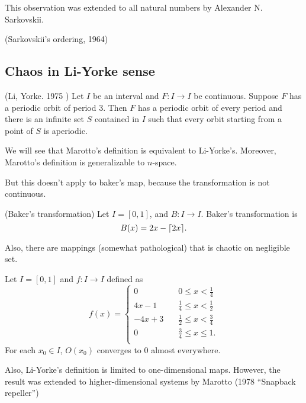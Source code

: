 \documentclass[11pt]{article}
\begin{document}
This observation was extended to all natural numbers by Alexander N. Sarkovskii.
\begin{definition}
  (Sarkovskii's ordering, 1964)
  \label{defn:sarkovskiiordering}
\end{definition}

\subsection{Chaos in Li-Yorke sense}
\begin{proposition}
  (Li, Yorke. 1975 \cite{li-yorke})
  Let $I$ be an interval and $F: I\to I$ be continuous. Suppose $F$ has a periodic orbit of period 3.
  Then $F$ has a periodic orbit of every period and there is an infinite set $S$ contained in
  $I$ such that every orbit starting from a point of $S$ is aperiodic.
\end{proposition}

We will see that Marotto's definition is equivalent to Li-Yorke's.
Moreover, Marotto's definition is generalizable to $n$-space.

But this doesn't apply to baker's map, because the transformation is not continuous.
\begin{definition}
  (Baker's transformation)
  Let $I = [0,1]$, and $B: I \to I$. Baker's transformation is
  \begin{equation*}
    B(x) = 2x - \lceil2x\rceil.
  \end{equation*}
\end{definition}

Also, there are mappings  (somewhat pathological) that is chaotic on negligible set.
\begin{proposition}
  Let $I = [0,1]$ and $f: I \to I$ defined as
  \begin{equation*}
    f(x) =
    \begin{cases}
      0 \quad & 0\leq x < \frac{1}{4} \\
      4x - 1 \quad  & \frac{1}{4} \leq x < \frac{1}{2} \\
      -4x + 3 \quad & \frac{1}{2} \leq x < \frac{3}{4} \\
      0 \quad & \frac{3}{4} \leq x \leq 1. \\
    \end{cases}
  \end{equation*}
  For each $x_0 \in I$, $O(x_0)$ converges to 0 almost everywhere.
\end{proposition}

Also, Li-Yorke's definition is limited to one-dimensional maps.
However, the result was extended to higher-dimensional systems by Marotto (1978 ``Snapback repeller'')



\end{document}
